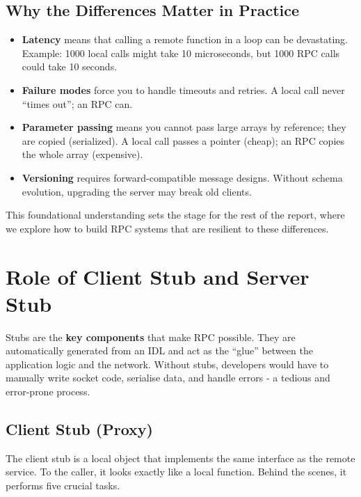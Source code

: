 \documentclass[10pt,a4paper]{article}
\begin{document}
\subsection{Why the Differences Matter in Practice}
\begin{itemize}
    \item \textbf{Latency} means that calling a remote function in a loop can be devastating. Example: 1000 local calls might take 10 microseconds, but 1000 RPC calls could take 10 seconds.
    \item \textbf{Failure modes} force you to handle timeouts and retries. A local call never “times out”; an RPC can.
    \item \textbf{Parameter passing} means you cannot pass large arrays by reference; they are copied (serialized). A local call passes a pointer (cheap); an RPC copies the whole array (expensive).
    \item \textbf{Versioning} requires forward-compatible message designs. Without schema evolution, upgrading the server may break old clients.
\end{itemize}

This foundational understanding sets the stage for the rest of the report, where we explore how to build RPC systems that are resilient to these differences.





























\section{Role of Client Stub and Server Stub}
Stubs are the \textbf{key components} that make RPC possible. They are automatically generated from an IDL and act as the “glue” between the application logic and the network. Without stubs, developers would have to manually write socket code, serialise data, and handle errors - a tedious and error-prone process.

\subsection{Client Stub (Proxy)}
The client stub is a local object that implements the same interface as the remote service. To the caller, it looks exactly like a local function. Behind the scenes, it performs five crucial tasks.
\end{document}
